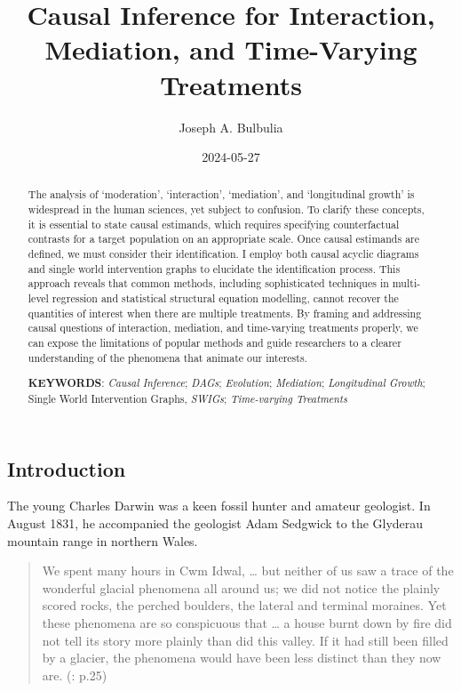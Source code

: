 \documentclass[
  single column]{article}
\title{Causal Inference for Interaction, Mediation, and Time-Varying
Treatments}
\author{Joseph A. Bulbulia}
\affil{%
             \small{     Victoria University of Wellington, New Zealand
          ORCID \textcolor[HTML]{A6CE39}{\aiOrcid} ~0000-0002-5861-2056 }
              }
\date{2024-05-27}
\begin{document}
\maketitle
\begin{abstract}
The analysis of `moderation', `interaction', `mediation', and
`longitudinal growth' is widespread in the human sciences, yet subject
to confusion. To clarify these concepts, it is essential to state causal
estimands, which requires specifying counterfactual contrasts for a
target population on an appropriate scale. Once causal estimands are
defined, we must consider their identification. I employ both causal
acyclic diagrams and single world intervention graphs to elucidate the
identification process. This approach reveals that common methods,
including sophisticated techniques in multi-level regression and
statistical structural equation modelling, cannot recover the quantities
of interest when there are multiple treatments. By framing and
addressing causal questions of interaction, mediation, and time-varying
treatments properly, we can expose the limitations of popular methods
and guide researchers to a clearer understanding of the phenomena that
animate our interests.

\textbf{KEYWORDS}: \emph{Causal Inference}; \emph{DAGs};
\emph{Evolution}; \emph{Mediation}; \emph{Longitudinal Growth}; Single
World Intervention Graphs, \emph{SWIGs}; \emph{Time-varying Treatments}
\end{abstract}

\subsection{Introduction}\label{id-introduction}

The young Charles Darwin was a keen fossil hunter and amateur geologist.
In August 1831, he accompanied the geologist Adam Sedgwick to the
Glyderau mountain range in northern Wales.

\begin{quote}
We spent many hours in Cwm Idwal, \ldots{} but neither of us saw a trace
of the wonderful glacial phenomena all around us; we did not notice the
plainly scored rocks, the perched boulders, the lateral and terminal
moraines. Yet these phenomena are so conspicuous that \ldots{} a house
burnt down by fire did not tell its story more plainly than did this
valley. If it had still been filled by a glacier, the phenomena would
have been less distinct than they now are.
(: p.25)
\end{quote}
\end{document}

